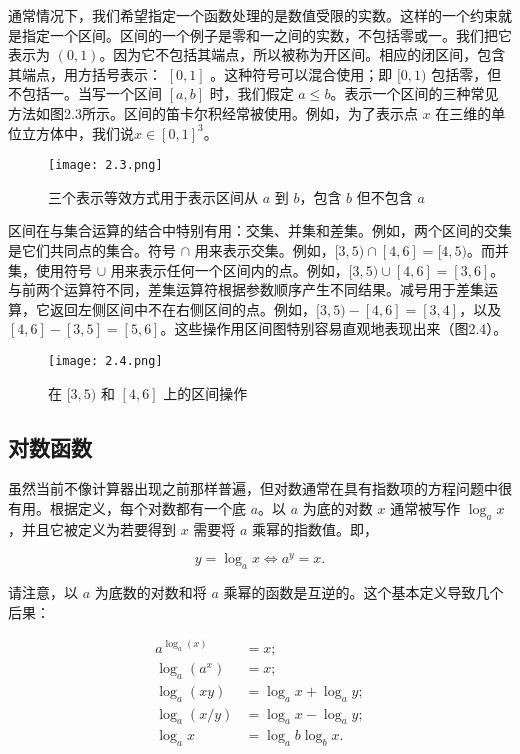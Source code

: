 \documentclass[lang=cn,12pt]{elegantbook}
\begin{document}
通常情况下，我们希望指定一个函数处理的是数值受限的实数。这样的一个约束就是指定一个区间。区间的一个例子是零和一之间的实数，不包括零或一。我们把它表示为 $(0,1)$。因为它不包括其端点，所以被称为开区间。相应的闭区间，包含其端点，用方括号表示： $[ 0 , 1 ]$ 。这种符号可以混合使用；即 $[0,1)$ 包括零，但不包括一。当写一个区间 $[a,b]$ 时，我们假定 $a \leq b$。表示一个区间的三种常见方法如图2.3所示。区间的笛卡尔积经常被使用。例如，为了表示点 $x$ 在三维的单位立方体中，我们说$x \in [0, 1]^3$。

\begin{figure}[htbp]
\centering
\texttt{[image: 2.3.png]}
\caption{三个表示等效方式用于表示区间从 $a$ 到 $b$，包含 $b$ 但不包含 $a$}
\end{figure}

区间在与集合运算的结合中特别有用：交集、并集和差集。例如，两个区间的交集是它们共同点的集合。符号 $\cap$ 用来表示交集。例如，$[3,5) \cap [4,6] = [4,5)$。而并集，使用符号 $\cup$ 用来表示任何一个区间内的点。例如，$[3,5) \cup [4,6] = [3,6]$。与前两个运算符不同，差集运算符根据参数顺序产生不同结果。减号用于差集运算，它返回左侧区间中不在右侧区间的点。例如，$[3,5) - [4,6] = [3,4]$，以及 $[4,6] - [3,5] = [5,6]$。这些操作用区间图特别容易直观地表现出来（图2.4）。

\begin{figure}[htbp]
\centering
\texttt{[image: 2.4.png]}
\caption{在 $[3,5)$ 和 $[4,6]$ 上的区间操作}
\end{figure}

\subsection{对数函数}

虽然当前不像计算器出现之前那样普遍，但对数通常在具有指数项的方程问题中很有用。根据定义，每个对数都有一个底 $a$。以 $a$ 为底的对数 $x$ 通常被写作 $\log_ax$，并且它被定义为若要得到 $x$ 需要将 $a$ 乘幂的指数值。即，

$$y = \log_ax \iff a^y = x. $$

请注意，以 $a$ 为底数的对数和将 $a$ 乘幂的函数是互逆的。这个基本定义导致几个后果：

$$
\begin{aligned}
a^{\log_a(x)} &= x; \\
\log_a(a^x) &= x; \\
\log_a(xy) &= \log_ax+\log_ay; \\
\log_a(x/y) &= \log_ax-\log_ay; \\
\log_ax &= \log_ab\log_bx.
\end{aligned}
$$
\end{document}
